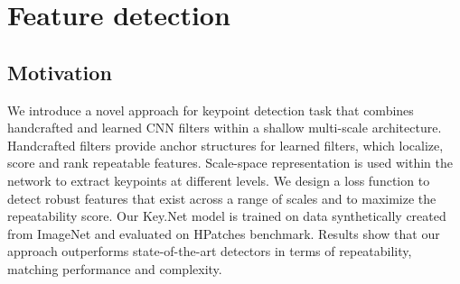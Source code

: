 \section{Feature detection}

\subsection{Motivation}

We introduce a novel approach for keypoint detection task that combines handcrafted and learned CNN filters within a shallow multi-scale architecture. Handcrafted filters provide anchor structures for learned filters, which localize, score and rank repeatable features. Scale-space representation is used within the network to extract keypoints at different levels. We design a loss function to detect robust features that exist across a range of scales and to maximize the repeatability score. Our Key.Net model is trained on data synthetically created from ImageNet and evaluated on HPatches benchmark. Results show that our approach outperforms state-of-the-art detectors in terms of repeatability, matching performance and complexity.

